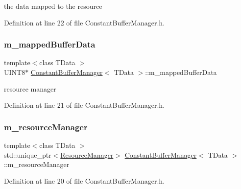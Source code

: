 the data mapped to the resource 



Definition at line 22 of file Constant\+Buffer\+Manager.\+h.

\mbox{\label{class_constant_buffer_manager_a35b50fb75b21a3b98adca908b5c144c6}} 
\subsubsection{\texorpdfstring{m\+\_\+mapped\+Buffer\+Data}{m\_mappedBufferData}}
{\footnotesize\ttfamily template$<$class T\+Data $>$ \\
U\+I\+N\+T8$\ast$ \mbox{\hyperlink{class_constant_buffer_manager}{Constant\+Buffer\+Manager}}$<$ T\+Data $>$\+::m\+\_\+mapped\+Buffer\+Data\hspace{0.3cm}{\ttfamily [private]}}



resource manager 



Definition at line 21 of file Constant\+Buffer\+Manager.\+h.

\mbox{\label{class_constant_buffer_manager_a8302ee559cb53baaf2233fcb20b867b4}} 
\subsubsection{\texorpdfstring{m\+\_\+resource\+Manager}{m\_resourceManager}}
{\footnotesize\ttfamily template$<$class T\+Data $>$ \\
std\+::unique\+\_\+ptr$<$\mbox{\hyperlink{class_resource_manager}{Resource\+Manager}}$>$ \mbox{\hyperlink{class_constant_buffer_manager}{Constant\+Buffer\+Manager}}$<$ T\+Data $>$\+::m\+\_\+resource\+Manager\hspace{0.3cm}{\ttfamily [private]}}



Definition at line 20 of file Constant\+Buffer\+Manager.\+h.

